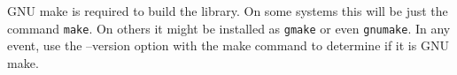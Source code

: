 

GNU make is required to build the library.  On some
systems this will be just the command \texttt{make}.  On others 
it might be installed as \texttt{gmake} or even \texttt{gnumake}.
In any event, use the --version option with the make command
to determine if it is GNU make.  
